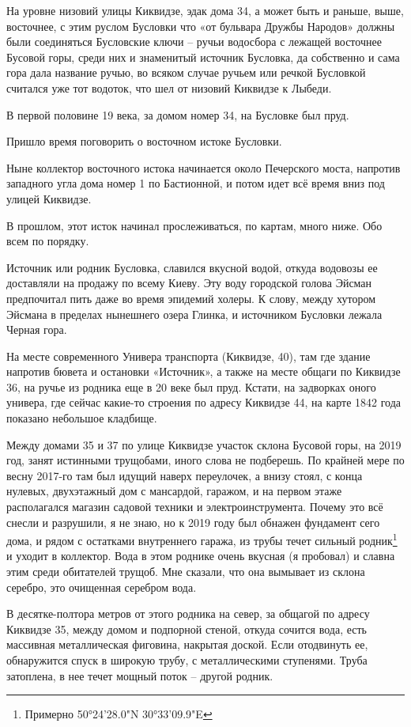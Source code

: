 На уровне низовий улицы Киквидзе, эдак дома 34, а может быть и раньше, выше, восточнее, с этим руслом Бусловки что «от бульвара Дружбы Народов» должны были соединяться Бусловские ключи – ручьи водосбора с лежащей восточнее Бусовой горы, среди них и знаменитый источник Бусловка, да собственно и сама гора дала название ручью, во всяком случае ручьем или речкой Бусловкой считался уже тот водоток, что шел от низовий Киквидзе к Лыбеди.

В первой половине 19 века, за домом номер 34, на Бусловке был пруд.

Пришло время поговорить о восточном истоке Бусловки.

Ныне коллектор восточного истока начинается около Печерского моста, напротив западного угла дома номер 1 по Бастионной, и потом идет всё время вниз под улицей Киквидзе. 

В прошлом, этот исток начинал прослеживаться, по картам, много ниже. Обо всем по порядку.

Источник или родник Бусловка, славился вкусной водой, откуда водовозы ее доставляли на продажу по всему Киеву. Эту воду городской голова Эйсман предпочитал пить даже во время эпидемий холеры. К слову, между хутором Эйсмана в пределах нынешнего озера Глинка, и источником Бусловки лежала Черная гора.

На месте современного Универа транспорта (Киквидзе, 40), там где здание напротив бювета и остановки «Источник», а также на месте общаги по Киквидзе 36, на ручье из родника еще в 20 веке был пруд. Кстати, на задворках оного универа, где сейчас какие-то строения по адресу Киквидзе 44, на карте 1842 года показано небольшое кладбище.

Между домами 35 и 37 по улице Киквидзе участок склона Бусовой горы, на 2019 год, занят истинными трущобами, иного слова не подберешь. По крайней мере по весну 2017-го там был идущий наверх переулочек, а внизу стоял, с конца нулевых, двухэтажный дом с мансардой, гаражом, и на первом этаже располагался магазин садовой техники и электроинструмента. Почему это всё снесли и разрушили, я не знаю, но к 2019 году был обнажен фундамент сего дома, и рядом с остатками внутреннего гаража, из трубы течет сильный родник\footnote{Примерно 50°24'28.0"N 30°33'09.9"E} и уходит в коллектор. Вода в этом роднике очень вкусная (я пробовал) и славна этим среди обитателей трущоб. Мне сказали, что она вымывает из склона серебро, это очищенная серебром вода.

В десятке-полтора метров от этого родника на север, за общагой по адресу Киквидзе 35, между домом и подпорной стеной, откуда сочится вода, есть массивная металлическая фиговина, накрытая доской. Если отодвинуть ее, обнаружится спуск в широкую трубу, с металлическими ступенями. Труба затоплена, в нее течет мощный поток – другой родник.

